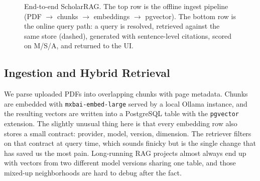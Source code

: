 \documentclass[10pt]{article}
\begin{document}
\begin{figure}[t]
\centering
{}
\caption{End-to-end ScholarRAG. The top row is the offline ingest
pipeline (PDF $\rightarrow$ chunks $\rightarrow$ embeddings
$\rightarrow$ pgvector). The bottom row is the online query path: a
query is resolved, retrieved against the same store (dashed),
generated with sentence-level citations, scored on M/S/A, and
returned to the UI.}
\label{fig:overview}
\end{figure}

\subsection{Ingestion and Hybrid Retrieval}
We parse uploaded PDFs into overlapping chunks with page metadata.
Chunks are embedded with \texttt{mxbai-embed-large} served by a local
Ollama instance, and the resulting vectors are written into a
PostgreSQL table with the \texttt{pgvector} extension. The slightly
unusual thing here is that every embedding row also stores a small
contract: provider, model, version, dimension. The retriever filters
on that contract at query time, which sounds finicky but is the
single change that has saved us the most pain. Long-running RAG
projects almost always end up with vectors from two different model
versions sharing one table, and those mixed-up neighborhoods are
hard to debug after the fact.
\end{document}
